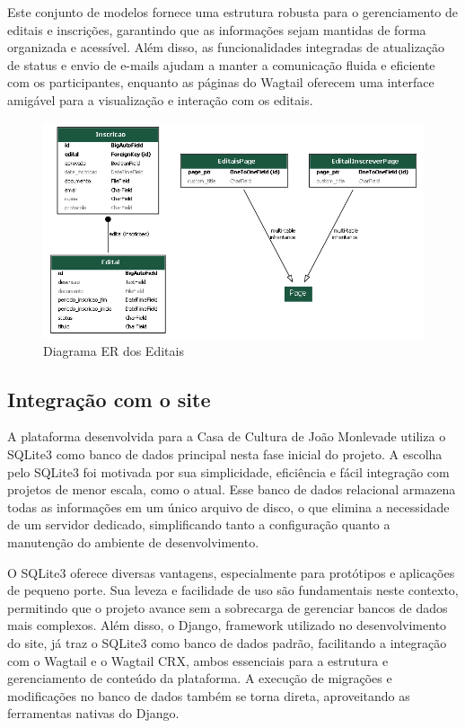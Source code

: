 Este conjunto de modelos fornece uma estrutura robusta para o gerenciamento de editais e inscrições, garantindo que as informações sejam mantidas de forma organizada e acessível. Além disso, as funcionalidades integradas de atualização de status e envio de e-mails ajudam a manter a comunicação fluida e eficiente com os participantes, enquanto as páginas do Wagtail oferecem uma interface amigável para a visualização e interação com os editais.

\begin{figure}[htb]
	\caption{\label{fig_grafico}Diagrama ER dos Editais}
	\begin{center}
	    \includegraphics[scale=0.3]{./img/er_diagram_editais.png}
	\end{center}
\end{figure}


\subsection{Integração com o site}

A plataforma desenvolvida para a Casa de Cultura de João Monlevade utiliza o SQLite3 como banco de dados principal nesta fase inicial do projeto. A escolha pelo SQLite3 foi motivada por sua simplicidade, eficiência e fácil integração com projetos de menor escala, como o atual. Esse banco de dados relacional armazena todas as informações em um único arquivo de disco, o que elimina a necessidade de um servidor dedicado, simplificando tanto a configuração quanto a manutenção do ambiente de desenvolvimento.

O SQLite3 oferece diversas vantagens, especialmente para protótipos e aplicações de pequeno porte. Sua leveza e facilidade de uso são fundamentais neste contexto, permitindo que o projeto avance sem a sobrecarga de gerenciar bancos de dados mais complexos. Além disso, o Django, framework utilizado no desenvolvimento do site, já traz o SQLite3 como banco de dados padrão, facilitando a integração com o Wagtail e o Wagtail CRX, ambos essenciais para a estrutura e gerenciamento de conteúdo da plataforma. A execução de migrações e modificações no banco de dados também se torna direta, aproveitando as ferramentas nativas do Django.

